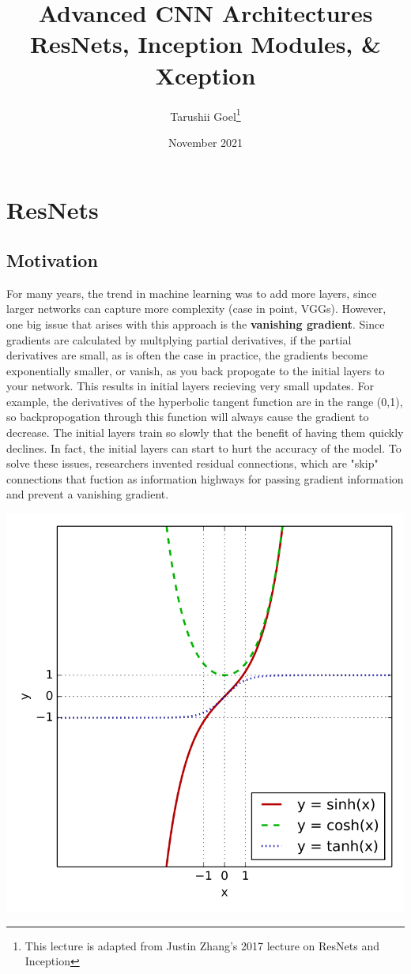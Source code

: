 \documentclass{article}
\title{Advanced CNN Architectures \\ ResNets, Inception Modules, \& Xception}
\author{Tarushii Goel\footnote{This lecture is adapted from Justin Zhang's 2017 lecture on ResNets and Inception}}
\date{November 2021}
\begin{document}
\maketitle

\section{ResNets}
\subsection{Motivation}
For many years, the trend in machine learning was to add more layers, since larger networks can capture more complexity (case in point, VGGs). However, one big issue that arises with this approach is the {\bf vanishing gradient}. Since gradients are calculated by multplying partial derivatives, if the partial derivatives are small, as is often the case in practice, the gradients become exponentially smaller, or vanish, as you back propogate to the initial layers to your network. This results in initial layers recieving very small updates. For example, the derivatives of the hyperbolic tangent function are in the range (0,1), so backpropogation through this function will always cause the gradient to decrease. The initial layers train so slowly that the benefit of having them quickly declines. In fact, the initial layers can start to hurt the accuracy of the model. To solve these issues, researchers invented residual connections, which are "skip" connections that fuction as information highways for passing gradient information and prevent a vanishing gradient. 
\begin{center}
\includegraphics[scale=0.2]{tanh.png}
\end{center}
\end{document}
